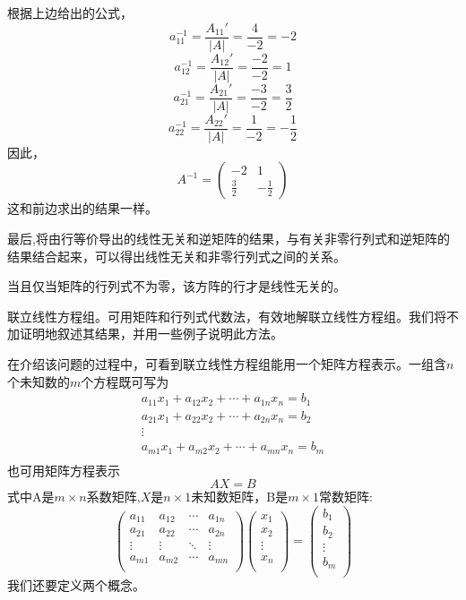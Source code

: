 根据上边给出的公式，
\[a_{11}^{-1}=\frac{A_{11}'}{|A|}=\frac{4}{-2}=-2\]
\[a_{12}^{-1}=\frac{A_{12}'}{|A|}=\frac{-2}{-2}=1\]
\[a_{21}^{-1}=\frac{A_{21}'}{|A|}=\frac{-3}{-2}=\frac{3}{2}\]
\[a_{22}^{-1}=\frac{A_{22}'}{|A|}=\frac{1}{-2}=-\frac{1}{2}\]
因此，
\[
A^{-1}=
\begin{pmatrix}
    -2 & 1 \\
    \frac{3}{2} & -\frac{1}{2}
\end{pmatrix}    
\]
这和前边求出的结果一样。

最后,将由行等价导出的线性无关和逆矩阵的结果，与有关非零行列式和逆矩阵的结果结合起来，可以得出线性无关和非零行列式之间的关系。

\begin{theorem}
    当且仅当矩阵的行列式不为零，该方阵的行才是线性无关的。
\end{theorem}

联立线性方程组。可用矩阵和行列式代数法，有效地解联立线性方程组。我们将不加证明地叙述其结果，并用一些例子说明此方法。

在介绍该问题的过程中，可看到联立线性方程组能用一个矩阵方程表示。一组含$n$个未知数的$m$个方程既可写为
\[
\begin{array}{c}
    a_{11}x_1+a_{12}x_2+ \cdots +a_{1n}x_n=b_1 \\
    a_{21}x_1+a_{22}x_2+ \cdots +a_{2n}x_n=b_2 \\
    \vdots \\
    a_{m1}x_1+a_{m2}x_2+ \cdots +a_{mn}x_n=b_m \\
\end{array}    
\tag{3-38}
\]
也可用矩阵方程表示
\[AX=B \tag{3-39}\]
式中A是$m \times n$系数矩阵,$X$是$n \times 1$未知数矩阵，B是$m \times 1$常数矩阵:
\[
\begin{pmatrix}
    a_{11} & a_{12} & \cdots & a_{1n} \\
    a_{21} & a_{22} & \cdots & a_{2n} \\
    \vdots & \vdots & \ddots & \vdots \\
    a_{m1} & a_{m2} & \cdots & a_{mn} \\
\end{pmatrix}    
\begin{pmatrix}
    x_{1} \\
    x_{2} \\
    \vdots \\
    x_{n} \\
\end{pmatrix} 
=
\begin{pmatrix}
    b_{1} \\
    b_{2} \\
    \vdots \\
    b_{m} \\
\end{pmatrix} 
\tag{3-40}
\]
我们还要定义两个概念。

